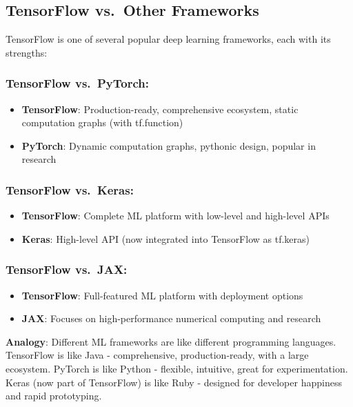 \documentclass[
  letterpaper,
  DIV=11,
  numbers=noendperiod]{scrreprt}
\providecommand{\tightlist}{%
  \setlength{\itemsep}{0pt}\setlength{\parskip}{0pt}}\usepackage{longtable,booktabs,array}
\begin{document}
\subsection{TensorFlow vs.~Other
Frameworks}\label{tensorflow-vs.-other-frameworks}

TensorFlow is one of several popular deep learning frameworks, each with
its strengths:

\subsubsection{TensorFlow vs.~PyTorch:}\label{tensorflow-vs.-pytorch}

\begin{itemize}
\tightlist
\item
  \textbf{TensorFlow}: Production-ready, comprehensive ecosystem, static
  computation graphs (with tf.function)
\item
  \textbf{PyTorch}: Dynamic computation graphs, pythonic design, popular
  in research
\end{itemize}

\subsubsection{TensorFlow vs.~Keras:}\label{tensorflow-vs.-keras}

\begin{itemize}
\tightlist
\item
  \textbf{TensorFlow}: Complete ML platform with low-level and
  high-level APIs
\item
  \textbf{Keras}: High-level API (now integrated into TensorFlow as
  tf.keras)
\end{itemize}

\subsubsection{TensorFlow vs.~JAX:}\label{tensorflow-vs.-jax}

\begin{itemize}
\tightlist
\item
  \textbf{TensorFlow}: Full-featured ML platform with deployment options
\item
  \textbf{JAX}: Focuses on high-performance numerical computing and
  research
\end{itemize}

\textbf{Analogy}: Different ML frameworks are like different programming
languages. TensorFlow is like Java - comprehensive, production-ready,
with a large ecosystem. PyTorch is like Python - flexible, intuitive,
great for experimentation. Keras (now part of TensorFlow) is like Ruby -
designed for developer happiness and rapid prototyping.
\end{document}
